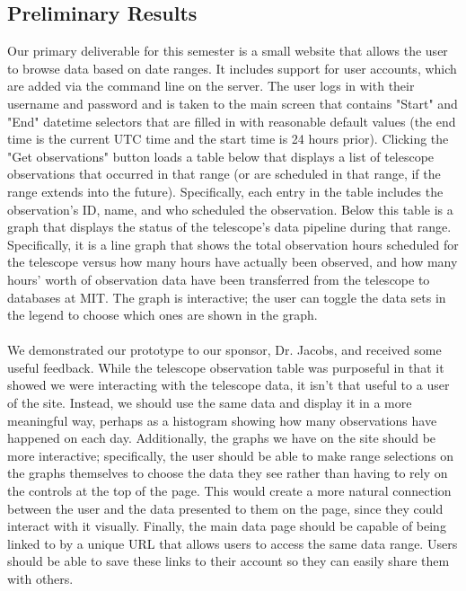 \documentclass[12pt]{article}
\begin{document}
\begin{spacing}{1.5}
\section{Preliminary Results}
Our primary deliverable for this semester is a small website that allows the user to browse data based on date ranges. It includes support for user accounts, which are added via the command line on the server. The user logs in with their username and password and is taken to the main screen that contains "Start" and "End" datetime selectors that are filled in with reasonable default values (the end time is the current UTC time and the start time is 24 hours prior). Clicking the "Get observations" button loads a table below that displays a list of telescope observations that occurred in that range (or are scheduled in that range, if the range extends into the future). Specifically, each entry in the table includes the observation's ID, name, and who scheduled the observation. Below this table is a graph that displays the status of the telescope's data pipeline during that range. Specifically, it is a line graph that shows the total observation hours scheduled for the telescope versus how many hours have actually been observed, and how many hours' worth of observation data have been transferred from the telescope to databases at MIT. The graph is interactive; the user can toggle the data sets in the legend to choose which ones are shown in the graph.
\\ \\
We demonstrated our prototype to our sponsor, Dr. Jacobs, and received some useful feedback. While the telescope observation table was purposeful in that it showed we were interacting with the telescope data, it isn't that useful to a user of the site. Instead, we should use the same data and display it in a more meaningful way, perhaps as a histogram showing how many observations have happened on each day. Additionally, the graphs we have on the site should be more interactive; specifically, the user should be able to make range selections on the graphs themselves to choose the data they see rather than having to rely on the controls at the top of the page. This would create a more natural connection between the user and the data presented to them on the page, since they could interact with it visually. Finally, the main data page should be capable of being linked to by a unique URL that allows users to access the same data range. Users should be able to save these links to their account so they can easily share them with others.


\end{spacing}
\end{document}
